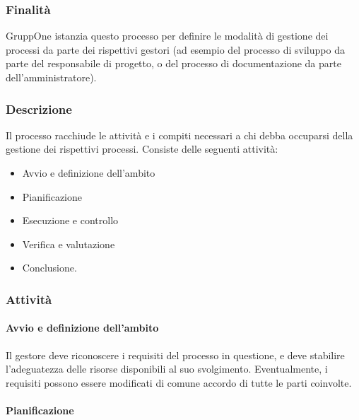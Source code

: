 \documentclass[../../norme-di-progetto.tex]{subfiles}
\begin{document}
\subsubsection{Finalità}%
\label{subs:gestione-di-processo/finalita}

GruppOne istanzia questo processo per definire le modalità di gestione dei processi da parte dei rispettivi gestori (ad esempio del processo di sviluppo da parte del responsabile di progetto, o del processo di documentazione da parte dell'amministratore).

\subsubsection{Descrizione}%
\label{subs:gestione-di-processo/descrizione}

Il processo racchiude le attività e i compiti necessari a chi debba occuparsi della gestione dei rispettivi processi.
Consiste delle seguenti attività:
\begin{itemize}
  \item Avvio e definizione dell'ambito
  \item Pianificazione
  \item Esecuzione e controllo
  \item Verifica e valutazione
  \item Conclusione.
\end{itemize}

\subsubsection{Attività}%
\label{subs:gestione-di-processo/attivita}

\paragraph{Avvio e definizione dell'ambito}%
\label{par:avvio_e_definizione_dell'ambito}

Il gestore deve riconoscere i requisiti del processo in questione, e deve stabilire l'adeguatezza delle risorse disponibili al suo svolgimento. Eventualmente, i requisiti possono essere modificati di comune accordo di tutte le parti coinvolte.

\paragraph{Pianificazione}%
\label{par:pianificazione}
\end{document}
